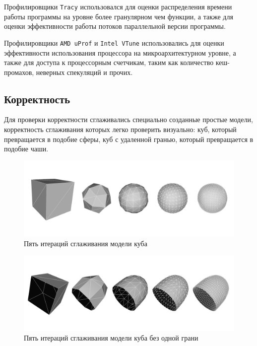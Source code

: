 \documentclass[14pt]{extarticle}
\begin{document}
Профилировщики \texttt{Tracy} использовался для оценки распределения времени работы программы на уровне более гранулярном чем функции, а также для оценки эффективности работы потоков параллельной версии программы.

Профилировщики \texttt{AMD uProf} и \texttt{Intel VTune} использовались для оценки эффективности использования процессора на микроархитектурном уровне, а также для доступа к процессорным счетчикам, таким как количество кеш-промахов, неверных спекуляций и прочих.

\subsection{Корректность}
Для проверки корректности сглаживались специально созданные простые модели, корректность сглаживания которых легко проверить визуально: куб, который превращается в подобие сферы, куб с удаленной гранью, который превращается в подобие чаши.

\begin{figure}[H]
    \centering
    \includegraphics[scale=1.0]{cubes.png}
    \caption{Пять итераций сглаживания модели куба}
\end{figure}

\begin{figure}[H]
    \centering
    \includegraphics[scale=1.0]{cube_holes.png}
    \caption{Пять итераций сглаживания модели куба без одной грани}
\end{figure}

\newpage
\end{document}

